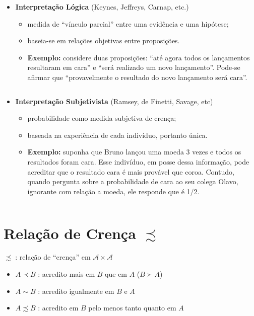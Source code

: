 \documentclass[
]{book}
\providecommand{\tightlist}{%
  \setlength{\itemsep}{0pt}\setlength{\parskip}{0pt}}
\begin{document}
\begin{itemize}
\tightlist
\item
  \textbf{Interpretação Lógica} (Keynes, Jeffreys, Carnap, etc.)

  \begin{itemize}
  \tightlist
  \item
    medida de ``vínculo parcial'' entre uma evidência e uma hipótese;
  \item
    baseia-se em relações objetivas entre proposições.
  \item
    \textbf{Exemplo:} considere duas proposições: ``até agora todos os lançamentos resultaram em cara'' e ``será realizado um novo lançamento''. Pode-se afirmar que ``provavelmente o resultado do novo lançamento será cara''.
  \end{itemize}
\end{itemize}

\(~\)

\begin{itemize}
\tightlist
\item
  \textbf{Interpretação Subjetivista} (Ramsey, de Finetti, Savage, etc)

  \begin{itemize}
  \tightlist
  \item
    probabilidade como medida subjetiva de crença;
  \item
    baseada na experiência de cada indivíduo, portanto única.
  \item
    \textbf{Exemplo:} suponha que Bruno lançou uma moeda 3 vezes e todos os resultados foram cara. Esse indivíduo, em posse dessa informação, pode acreditar que o resultado cara é mais provável que coroa. Contudo, quando pergunta sobre a probabilidade de cara ao seu colega Olavo, ignorante com relação a moeda, ele responde que é 1/2.
  \end{itemize}
\end{itemize}

\(~\)

\hypertarget{relauxe7uxe3o-de-crenuxe7a-precsim}{%
\section{\texorpdfstring{Relação de Crença \(\precsim\)}{Relação de Crença \textbackslash precsim}}\label{relauxe7uxe3o-de-crenuxe7a-precsim}}

\(\precsim\) : relação de ``crença'' em \(\mathcal{A}\times\mathcal{A}\)

\begin{itemize}
\tightlist
\item
  \(A \prec B\) : acredito mais em \(B\) que em \(A\) (\(B \succ A\))
\item
  \(A \sim B\) : acredito igualmente em \(B\) e \(A\)
\item
  \(A \precsim B\) : acredito em \(B\) pelo menos tanto quanto em \(A\)
\end{itemize}
\end{document}
